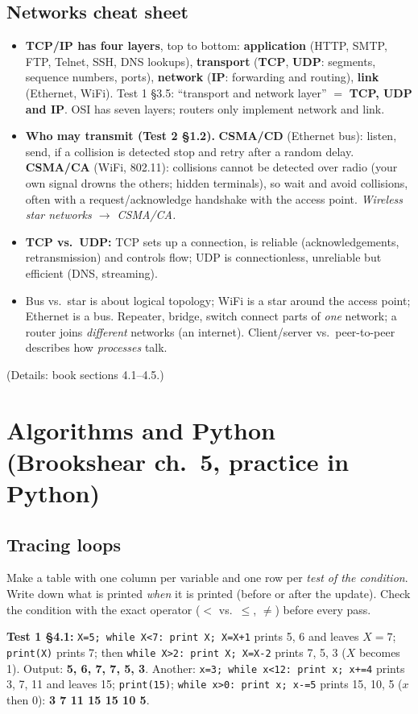 \documentclass{fkt-notes}
\begin{document}
\subsection{Networks cheat sheet}
\begin{itemize}[nosep]
  \item \textbf{TCP/IP has four layers}, top to bottom: \textbf{application} (HTTP, SMTP, FTP, Telnet, SSH, DNS lookups),
        \textbf{transport} (\textbf{TCP}, \textbf{UDP}: segments, sequence numbers, ports),
        \textbf{network} (\textbf{IP}: forwarding and routing), \textbf{link} (Ethernet, WiFi).
        Test 1 \S3.5: ``transport and network layer'' $=$ \textbf{TCP, UDP and IP}.
        OSI has seven layers; routers only implement network and link.
  \item \textbf{Who may transmit (Test 2 \S1.2).} \textbf{CSMA/CD} (Ethernet bus): listen, send, if a collision is
        detected stop and retry after a random delay. \textbf{CSMA/CA} (WiFi, 802.11): collisions cannot be
        detected over radio (your own signal drowns the others; hidden terminals), so wait and
        avoid collisions, often with a request/acknowledge handshake with the access point.
        \emph{Wireless star networks $\to$ CSMA/CA.}
  \item \textbf{TCP vs.\ UDP:} TCP sets up a connection, is reliable (acknowledgements, retransmission) and
        controls flow; UDP is connectionless, unreliable but efficient (DNS, streaming).
  \item Bus vs.\ star is about logical topology; WiFi is a star around the access point; Ethernet is a bus.
        Repeater, bridge, switch connect parts of \emph{one} network; a router joins \emph{different}
        networks (an internet). Client/server vs.\ peer-to-peer describes how \emph{processes} talk.
\end{itemize}
(Details: book sections 4.1--4.5.)

\newpage
\section{Algorithms and Python (Brookshear ch.~5, practice in Python)}

\subsection{Tracing loops}
\begin{rulebox}[title={Method: ``what is printed?''}]
  Make a table with one column per variable and one row per \emph{test of the condition}.
  Write down what is printed \emph{when} it is printed (before or after the update). Check the
  condition with the exact operator ($<$ vs.\ $\le$, $\ne$) before every pass.
\end{rulebox}
\textbf{Test 1 \S4.1:} \texttt{X=5; while X<7: print X; X=X+1} prints 5, 6 and leaves $X=7$;
\texttt{print(X)} prints 7; then \texttt{while X>2: print X; X=X-2} prints 7, 5, 3 ($X$ becomes 1).
Output: \textbf{5, 6, 7, 7, 5, 3}.
Another: \texttt{x=3; while x<12: print x; x+=4} prints 3, 7, 11 and leaves 15; \texttt{print(15)};
\texttt{while x>0: print x; x-=5} prints 15, 10, 5 ($x$ then 0): \textbf{3 7 11 15 15 10 5}.
\end{document}

